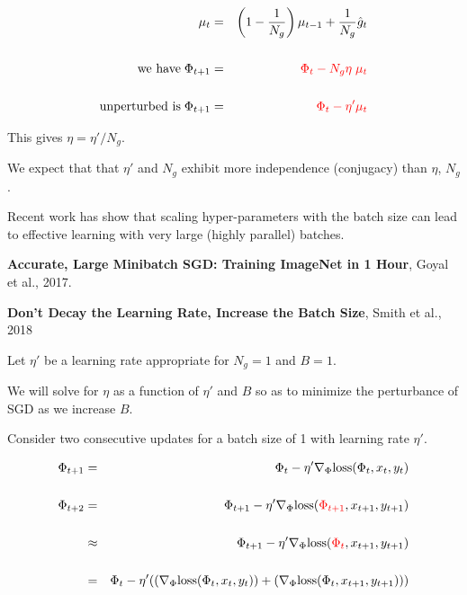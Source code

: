 {

\begin{eqnarray*}
\mu_t & = &  \left(1-\frac{1}{N_g}\right)\mu_{t-1} + \frac{1}{N_g} \hat{g}_t \\
\\
\mbox{we have}\;\Phi_{t+1}& = & {\color{red} \Phi_t - N_g\eta\;\mu_t} \\
\\
\mbox{unperturbed is}\;\Phi_{t+1}& = & {\color{red} \Phi_t - \eta'\mu_t}
\end{eqnarray*}

\vfill
This gives {\color{red} $\eta = \eta'/N_g$}.

\vfill
We expect that that $\eta'$ and $N_g$ exhibit more independence (conjugacy) than $\eta$, $N_g$.


Recent work has show that scaling hyper-parameters with the batch size can lead to effective learning with very large (highly parallel)
batches.

\vfill
{\bf Accurate, Large Minibatch SGD: Training ImageNet in 1 Hour}, Goyal et al., 2017.

\vfill
{\bf Don't Decay the Learning Rate, Increase the Batch Size}, Smith et al., 2018



Let $\eta'$ be a learning rate appropriate for $N_g = 1$ and $B = 1$.

\vfill
We will solve for $\eta$ as a function of $\eta'$ and $B$ so as to minimize the perturbance of SGD as we increase $B$.


Consider two consecutive updates for a batch size of 1 with learning rate $\eta'$.

\begin{eqnarray*}
  \Phi_{t+1} & = & \Phi_t - \eta' \nabla_\Phi \mathrm{loss}(\Phi_t,x_t,y_t) \\
  \\
  \Phi_{t+2} & = & \Phi_{t+1} - \eta' \nabla_\Phi \mathrm{loss}({\color{red} \Phi_{t+1}},x_{t+1},y_{t+1}) \\\
  \\
  & \approx & \Phi_{t+1} - \eta' \nabla_\Phi \mathrm{loss}({\color{red} \Phi_t},x_{t+1},y_{t+1}) \\
  \\
  & = & \Phi_t - \eta'((\nabla_\Phi \mathrm{loss}(\Phi_t,x_t,y_t)) + (\nabla_\Phi \mathrm{loss}(\Phi_t,x_{t+1},y_{t+1})))
\end{eqnarray*}

}
